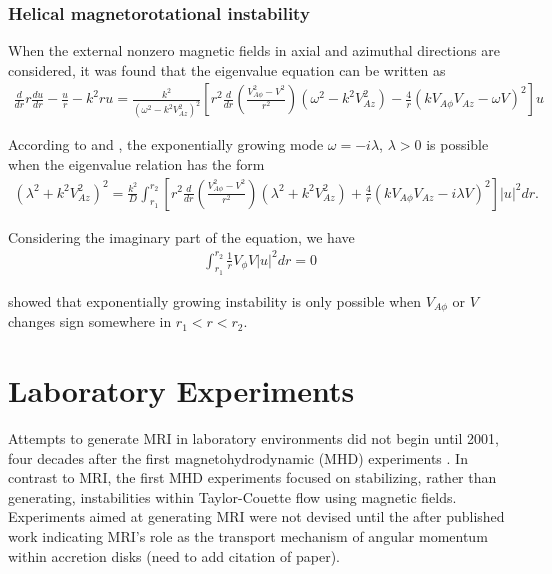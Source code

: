 \documentclass{jfm}
\begin{document}
\subsubsection{Helical magnetorotational instability}

When the external nonzero magnetic fields in axial and azimuthal directions are
considered, it was found that the eigenvalue equation can be written as
\begin{align}
    \frac{d}{dr}r\frac{du}{dr}-\frac{u}{r}-k^2ru = \frac{k^2}{(\omega^2-k^2 V_{Az}^2)^2}\left[r^2 \frac{d}{dr}\left(\frac{V_{A\phi}^2-V^2}{r^2}\right)
    (\omega^2-k^2V_{Az}^2) 
    -\frac{4}{r}(kV_{A\phi}V_{Az}-\omega V)^2\right]u
\end{align}

According to \cite{Knobloch1992} and \cite{Julien2010}, the exponentially 
growing mode $\omega =-i\lambda$, $\lambda>0$ is possible when the eigenvalue 
relation has the form
\begin{align}
    (\lambda^2 +k^2 V_{Az}^2)^2 = \frac{k^2}{D}\int_{r_1}^{r_2} \left[ r^2 \frac{d}{dr}\left( \frac{V_{A\phi}^2-V^2}{r^2}\right)(\lambda^2+k^2 V_{Az}^2) + \frac{4}{r}(k V_{A\phi} V_{Az}-i\lambda V)^2 \right]|u|^2 dr.
\end{align}

Considering the imaginary part of the equation, we have 
\begin{align}
    \int_{r_1}^{r_2} \frac{1}{r}V_\phi V |u|^2 dr =0
\end{align}

\cite{Knobloch1992} showed that exponentially growing instability is only possible 
when $V_{A\phi}$ or $V$ changes sign somewhere in $r_1< r < r_2$.



\section{Laboratory Experiments}
\label{sec:experiments}

Attempts to generate MRI in laboratory environments did not begin until 2001,
four decades after the first magnetohydrodynamic (MHD) experiments 
\citep[see][]{Donnelly1960}. In contrast to MRI, the first MHD experiments 
focused on stabilizing, rather than generating, instabilities within 
Taylor-Couette flow using magnetic fields. Experiments aimed at generating MRI
were not devised until the after published work indicating MRI's role as the
transport mechanism of angular momentum within accretion disks (need to add citation of paper).
\end{document}
